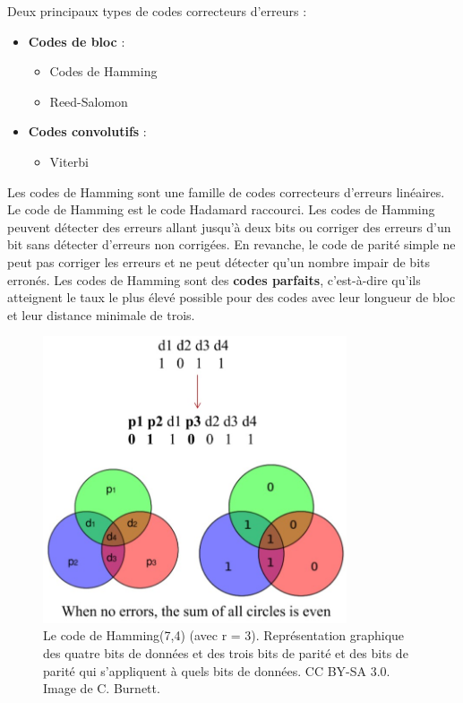 Deux principaux types de codes correcteurs d’erreurs :
\begin{itemize}
    \item \textbf{Codes de bloc} :
          \begin{itemize}
              \item Codes de Hamming
              \item Reed-Salomon
          \end{itemize}
    \item \textbf{Codes convolutifs} :
          \begin{itemize}
              \item Viterbi
          \end{itemize}
\end{itemize}
Les codes de Hamming sont une famille de codes correcteurs d'erreurs linéaires. Le code de Hamming est le code Hadamard raccourci. Les codes de Hamming peuvent détecter des erreurs allant jusqu'à deux bits ou corriger des erreurs d'un bit sans détecter d'erreurs non corrigées. En revanche, le code de parité simple ne peut pas corriger les erreurs et ne peut détecter qu'un nombre impair de bits erronés. Les codes de Hamming sont des \textbf{codes parfaits}, c'est-à-dire qu'ils atteignent le taux le plus élevé possible pour des codes avec leur longueur de bloc et leur distance minimale de trois.
\begin{figure}[H] %
    \centering
    \includegraphics[width=0.8\textwidth]{figures/6-26.jpg}
    \caption{Le code de Hamming(7,4) (avec r = 3). Représentation graphique des quatre bits de données et des trois bits de parité et des bits de parité qui s'appliquent à quels bits de données. CC BY-SA 3.0. Image de C. Burnett.}
    \label{fig:communication2}
\end{figure}
